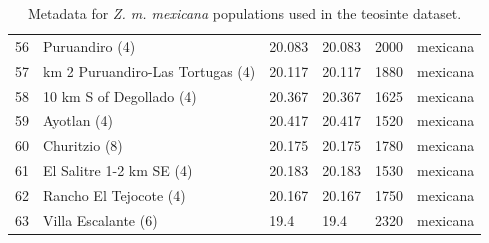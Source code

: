 \begin{table}
\begin{center}
{\begin{tabular}{r@{--}lllll}
56 & Puruandiro (4) & 20.083 & 20.083 & 2000 & mexicana \\ 
57 & km 2 Puruandiro-Las Tortugas (4) & 20.117 & 20.117 & 1880 & mexicana \\ 
58 & 10 km S of Degollado (4) & 20.367 & 20.367 & 1625 & mexicana \\ 
59 & Ayotlan (4) & 20.417 & 20.417 & 1520 & mexicana \\ 
60 & Churitzio (8) & 20.175 & 20.175 & 1780 & mexicana \\ 
61 & El Salitre 1-2 km SE (4) & 20.183 & 20.183 & 1530 & mexicana \\ 
62 & Rancho El Tejocote (4) & 20.167 & 20.167 & 1750 & mexicana \\ 
63 & Villa Escalante (6) & 19.4 & 19.4 & 2320 & mexicana \\ 
   \hline
\end{tabular}
}
\label{tab:zea_popdata2}
\end{center}
\caption{Metadata for \textit{Z. m. mexicana} populations used in the teosinte dataset.}
\end{table}


